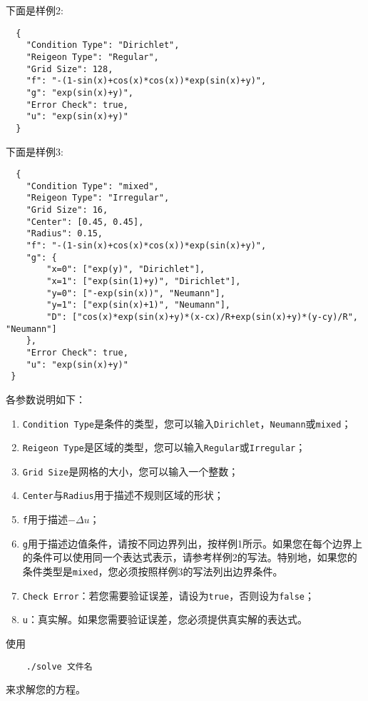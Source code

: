 \documentclass[lang=cn,11pt,a4paper]{elegantpaper}
\begin{document}
下面是样例2:
\begin{lstlisting}
  {
    "Condition Type": "Dirichlet",
    "Reigeon Type": "Regular",
    "Grid Size": 128,
    "f": "-(1-sin(x)+cos(x)*cos(x))*exp(sin(x)+y)",
    "g": "exp(sin(x)+y)",
    "Error Check": true,
    "u": "exp(sin(x)+y)"
  }
\end{lstlisting}

下面是样例3:
\begin{lstlisting}
  {
    "Condition Type": "mixed",
    "Reigeon Type": "Irregular",
    "Grid Size": 16,
    "Center": [0.45, 0.45],
    "Radius": 0.15,
    "f": "-(1-sin(x)+cos(x)*cos(x))*exp(sin(x)+y)",
    "g": {
        "x=0": ["exp(y)", "Dirichlet"],
        "x=1": ["exp(sin(1)+y)", "Dirichlet"],
        "y=0": ["-exp(sin(x))", "Neumann"],
        "y=1": ["exp(sin(x)+1)", "Neumann"],
        "D": ["cos(x)*exp(sin(x)+y)*(x-cx)/R+exp(sin(x)+y)*(y-cy)/R", "Neumann"]
    },
    "Error Check": true,
    "u": "exp(sin(x)+y)"
 }
\end{lstlisting}

各参数说明如下：

\begin{enumerate}[(1)]
\item \verb|Condition Type|是条件的类型，您可以输入\verb|Dirichlet|，\verb|Neumann|或\verb|mixed|；
\item \verb|Reigeon Type|是区域的类型，您可以输入\verb|Regular|或\verb|Irregular|；
\item \verb|Grid Size|是网格的大小，您可以输入一个整数；
\item \verb|Center|与\verb|Radius|用于描述不规则区域的形状；
\item \verb|f|用于描述$-\Delta u$；
\item \verb|g|用于描述边值条件，请按不同边界列出，按样例1所示。如果您在每个边界上的条件可以使用同一个表达式表示，请参考样例2的写法。特别地，如果您的条件类型是\verb|mixed|，您必须按照样例3的写法列出边界条件。
\item \verb|Check Error|：若您需要验证误差，请设为\verb|true|，否则设为\verb|false|；
\item \verb|u|：真实解。如果您需要验证误差，您必须提供真实解的表达式。
\end{enumerate}

使用
\begin{lstlisting}
    ./solve 文件名
\end{lstlisting}

来求解您的方程。
\end{document}
